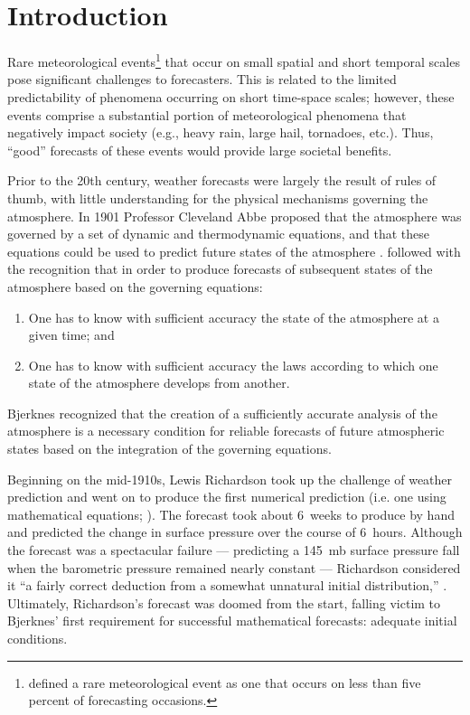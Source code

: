 

\chapter{Introduction}
\label{intro}

Rare meteorological events\footnote{\cite{Murphy1991} defined a rare meteorological event as one that occurs on less than five percent of forecasting occasions.} that occur on small spatial and short temporal scales pose significant challenges to forecasters.
This is related to the limited predictability of phenomena occurring on short time-space scales; however, these events comprise a substantial portion of meteorological phenomena that negatively impact society (e.g., heavy rain, large hail, tornadoes, etc.).
Thus, ``good'' forecasts of these events would provide large societal benefits.


Prior to the 20th century, weather forecasts were largely the result of rules of thumb, with little understanding for the physical mechanisms governing the atmosphere.
In 1901 Professor Cleveland Abbe proposed that the atmosphere was governed by a set of dynamic and thermodynamic equations, and that these equations could be used to predict future states of the atmosphere \citep{Abbe1901}.
\cite{Bjerknes1904} followed with the recognition that in order to produce forecasts of subsequent states of the atmosphere based on the governing equations:
\begin{enumerate}
    \item One has to know with sufficient accuracy the state of the atmosphere at a given time; and
    \item One has to know with sufficient accuracy the laws according to which one state of the atmosphere develops from another.
\end{enumerate}
Bjerknes recognized that the creation of a sufficiently accurate analysis of the atmosphere is a necessary condition for reliable forecasts of future atmospheric states based on the integration of the governing equations.


Beginning on the mid-1910s, Lewis Richardson took up the challenge of weather prediction and went on to produce the first numerical prediction (i.e. one using mathematical equations; \citealp{Lynch2008}).
The forecast took about \mbox{6 weeks} to produce by hand and predicted the change in surface pressure over the course of \mbox{6 hours}.
Although the forecast was a spectacular failure --- predicting a \mbox{145 mb} surface pressure fall when the barometric pressure remained nearly constant --- Richardson considered it ``a fairly correct deduction from a somewhat unnatural initial distribution,'' \citep{Lynch2008}.
Ultimately, Richardson's forecast was doomed from the start, falling victim to Bjerknes' first requirement for successful mathematical forecasts: adequate initial conditions.


